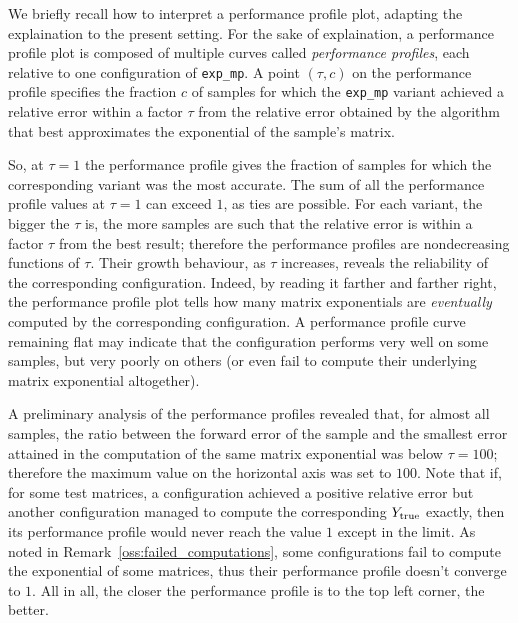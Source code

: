 We briefly recall how to interpret a performance profile plot, adapting the explaination to the present setting. For the sake of explaination, a performance profile plot is composed of multiple curves called \emph{performance profiles}, each relative to one configuration of \texttt{exp\_mp}. A point $(\tau,c)$ on the performance profile specifies the fraction $c$ of samples for which the \texttt{exp\_mp} variant achieved a relative error within a factor $\tau$ from the relative error obtained by the algorithm that best approximates the exponential of the sample's matrix.

So, at $\tau=1$ the performance profile gives the fraction of samples for which the corresponding variant was the most accurate. The sum of all the performance profile values at $\tau=1$ can exceed $1$, as ties are possible.
For each variant, the bigger the $\tau$ is, the more samples are such that the relative error is within a factor $\tau$ from the best result; therefore the performance profiles are nondecreasing functions of $\tau$. Their growth behaviour, as $\tau$ increases, reveals the reliability of the corresponding configuration.
Indeed, by reading it farther and farther right, the performance profile plot tells how many matrix exponentials are \emph{eventually} computed by the corresponding configuration. 
A performance profile curve remaining flat may indicate that the configuration performs very well on some samples, but very poorly on others (or even fail to compute their underlying matrix exponential altogether). 

A preliminary analysis of the performance profiles revealed that, for almost all samples, the ratio between the forward error of the sample and the smallest error attained in the computation of the same matrix exponential was below $\tau=100$; therefore the maximum value on the horizontal axis was set to $100$. Note that if, for some test matrices, a configuration achieved a positive relative error but another configuration managed to compute the corresponding $Y_{\textup{true}}$ exactly, then its performance profile would never reach the value $1$ except in the limit. As noted in Remark~\ref{oss:failed_computations}, some configurations fail to compute the exponential of some matrices, thus their performance profile doesn't converge to $1$. \newline
All in all, the closer the performance profile is to the top left corner, the better.
\smallskip 

